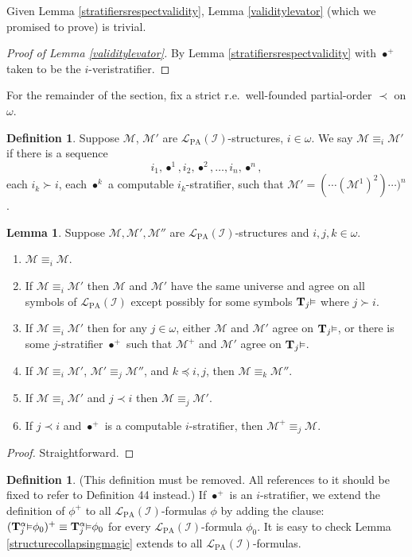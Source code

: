 \documentclass[reqno]{article}
\theoremstyle{definition}
\newtheorem{lemma}[theorem]{Lemma}
\newtheorem{definition}[theorem]{Definition}
\def\L{\mathscr{L}}
\def\M{\mathscr{M}}
\def\T{\mathbf{T}}
\def\LPA{\L_{\mathrm{PA}}}
\def\indset{\mathcal I}
\def\myequiv{\equiv}
\renewcommand{\Pr}[1]{\T_{#1}\mbox{\small${\vDash}$}}
\newcommand{\Prr}[2]{\T^{#1}_{#2}\mbox{\small${\vDash}$}}
\begin{document}
Given Lemma \ref{stratifiersrespectvalidity}, Lemma \ref{validitylevator} (which we promised to prove)
is trivial.

\begin{proof}[Proof of Lemma \ref{validitylevator}]
By Lemma \ref{stratifiersrespectvalidity} with $\bullet^+$ taken to be the $i$-veristratifier.
\end{proof}

For the remainder of the section, fix a strict r.e.~well-founded partial-order $\prec$ on $\omega$.

\begin{definition}
\label{equividefn}
Suppose $\M$, $\M'$ are $\LPA(\indset)$-structures, $i\in\omega$.
We say $\M\myequiv_i\M'$ if
there is a sequence \[i_1,\bullet^1,i_2,\bullet^2,\ldots,i_n,\bullet^n,\]
each $i_k\succ i$, each $\bullet^k$ a computable $i_k$-stratifier,
such that $\M'=(\cdots(\M^1)^2)\cdots)^n$.
\end{definition}

\begin{lemma}
\label{sequencelemma}
Suppose $\M,\M',\M''$ are $\LPA(\indset)$-structures and $i,j,k\in\omega$.
\begin{enumerate}
\item
$\M\myequiv_i\M$.
\item
If $\M\myequiv_i\M'$ then $\M$ and $\M'$ have the same universe and agree
on all symbols of $\LPA(\indset)$ except possibly for some symbols $\Pr j$
where $j\succ i$.
\item
If $\M\myequiv_i\M'$ then for any $j\in\omega$, either $\M$ and $\M'$ agree on $\Pr j$,
or there is some $j$-stratifier $\bullet^+$ such that $\M^+$ and $\M'$ agree on $\Pr j$.
\item
If $\M\myequiv_i\M'$, $\M'\myequiv_j\M''$, and $k\preceq i,j$, then $\M\myequiv_k\M''$.
\item
If $\M\myequiv_i\M'$ and $j\prec i$ then $\M\myequiv_j\M'$.
\item
If $j\prec i$ and $\bullet^+$ is a computable $i$-stratifier,
then $\M^+\myequiv_j\M$.
\end{enumerate}
\end{lemma}

\begin{proof}
Straightforward.
\end{proof}

\begin{definition}
\label{magicpreserver}
(This definition must be removed.  All references to it should be fixed to refer
to Definition 44 instead.)
If $\bullet^+$ is an $i$-stratifier, we extend the definition of $\phi^+$
to all $\LPA(\indset)$-formulas $\phi$ 
by adding the clause: $(\Prr\alpha j\phi_0)^+\equiv\Prr\alpha j\phi_0$ for every $\LPA(\indset)$-formula $\phi_0$.
It is easy to check Lemma \ref{structurecollapsingmagic} extends to all $\LPA(\indset)$-formulas.
\end{definition}
\end{document}
